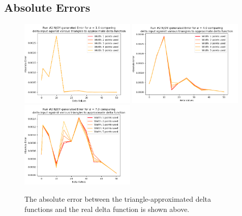 \documentclass[a4paper]{article}
\begin{document}
\subsection{Absolute Errors}
\begin{figure}[H]
\centering
\includegraphics[width=0.49\textwidth]{run2_absolute_error_alpha_equals_1.png}
\includegraphics[width=0.49\textwidth]{run2_absolute_error_alpha_equals_4.png}
\includegraphics[width=0.49\textwidth]{run2_absolute_error_alpha_equals_7.png}
\caption{\label{fig:run1_abs_error}The absolute error between the triangle-approximated delta functions and the real delta function is shown above. }
\end{figure}
\end{document}
